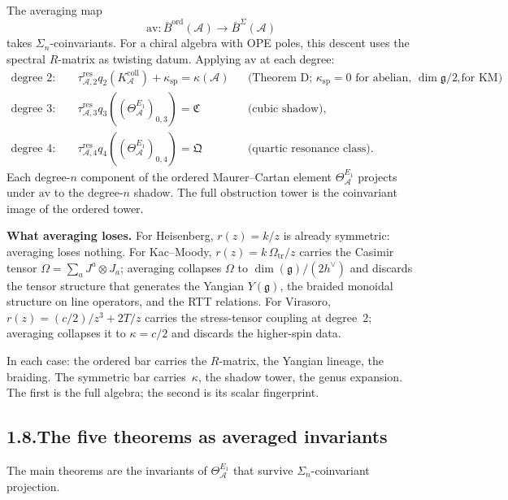 \documentclass[11pt,reqno]{amsart}
\theoremstyle{definition}
\theoremstyle{remark}
\providecommand{\cA}{\mathcal{A}}
\providecommand{\barB}{\bar{B}}
\providecommand{\fg}{\mathfrak{g}}
\numberwithin{equation}{section}
\begin{document}
The averaging map
\[
\mathrm{av}\colon\barB^{\mathrm{ord}}(\cA)\longrightarrow\barB^{\Sigma}(\cA)
\]
takes $\Sigma_n$-coinvariants. For a chiral algebra with OPE poles,
this descent uses the spectral $R$-matrix as twisting datum.
Applying $\mathrm{av}$ at each degree:
\begin{equation}\label{eq:av-organizing}
\begin{aligned}
\text{degree }2\colon&\quad
\tau_{\cA,2}^{\mathrm{res}}q_2(K_\cA^{\mathrm{coll}})
+\kappa_{\mathrm{sp}}=\kappa(\cA)
 &&\text{(Theorem D; $\kappa_{\mathrm{sp}}=0$ for abelian, $\dim\fg/2$ for KM)},\\
\text{degree }3\colon&\quad
\tau_{\cA,3}^{\mathrm{res}}q_3((\Theta_\cA^{E_1})_{0,3})
 =\mathfrak{C}
 &&\text{(cubic shadow)},\\
\text{degree }4\colon&\quad
\tau_{\cA,4}^{\mathrm{res}}q_4((\Theta_\cA^{E_1})_{0,4})
 =\mathfrak{Q}
 &&\text{(quartic resonance class)}.
\end{aligned}
\end{equation}
Each degree-$n$ component of the ordered Maurer--Cartan element
$\Theta^{E_1}_\cA$ projects under $\mathrm{av}$ to the degree-$n$
shadow. The full obstruction tower is the coinvariant image of
the ordered tower.

\medskip
\noindent\textbf{What averaging loses.}\enspace
For Heisenberg, $r(z)=k/z$ is already symmetric: averaging loses
nothing. For Kac--Moody, $r(z)=k\,\Omega_{\mathrm{tr}}/z$ carries the Casimir
tensor $\Omega=\sum_a J^a\otimes J_a$; averaging collapses
$\Omega$ to $\dim(\fg)/(2h^\vee)$ and discards the tensor structure
that generates the Yangian $Y(\fg)$, the braided monoidal structure
on line operators, and the RTT relations. For Virasoro,
$r(z)=(c/2)/z^3+2T/z$ carries the stress-tensor coupling at
degree~$2$; averaging collapses it to $\kappa=c/2$ and discards the
higher-spin data.

In each case: the ordered bar carries the $R$-matrix, the Yangian
lineage, the braiding. The symmetric bar carries~$\kappa$, the
shadow tower, the genus expansion. The first is the full algebra;
the second is its scalar fingerprint.

\subsection*{1.8.\enspace The five theorems as averaged invariants}

The main theorems are the invariants of
$\Theta^{E_1}_{\cA}$ that survive $\Sigma_n$-coinvariant projection.
\end{document}
